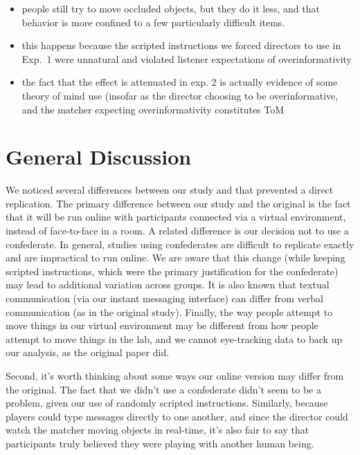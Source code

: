 \documentclass[10pt,letterpaper]{article}
\begin{document}
\begin{itemize}
\item people still try to move occluded objects, but they do it less, and that behavior is more confined to a few particularly difficult items.
\item this happens because the scripted instructions we forced directors to use in Exp.~1 were unnatural and violated listener expectations of overinformativity
\item the fact that the effect is attenuated in exp. 2 is actually evidence of some theory of mind use (insofar as the director choosing to be overinformative, and the matcher expecting overinformativity constitutes ToM
\end{itemize}

\section{General Discussion}

We noticed several differences between our study and  that prevented a direct replication. The primary difference between our study and the original is the fact that it will be run online with participants connected via a virtual environment, instead of face-to-face in a room. A related difference is our decision not to use a confederate. In general, studies using confederates are difficult to replicate exactly and are impractical to run online. We are aware that this change (while keeping scripted instructions, which were the primary justification for the confederate) may lead to additional variation across groups. It is also known that textual communication (via our instant messaging interface) can differ from verbal communication (as in the original study). Finally, the way people attempt to move things in our virtual environment may be different from how people attempt to move things in the lab, and we cannot eye-tracking data to back up our analysis, as the original paper did.

Second, it's worth thinking about some ways our online version may differ from the original. The fact that we didn't use a confederate didn't seem to be a problem, given our use of randomly scripted instructions. Similarly, because players could type messages directly to one another, and since the director could watch the matcher moving objects in real-time, it's also fair to say that participants truly believed they were playing with another human being. 
\end{document}

